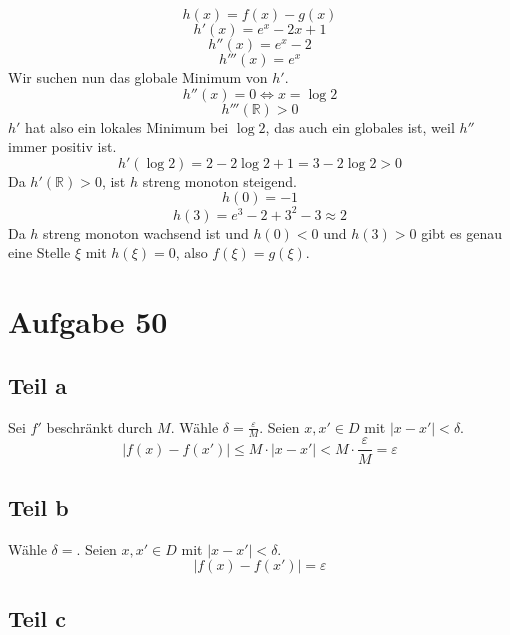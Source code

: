 \documentclass[a4paper,10pt]{article}
\begin{document}
\begin{equation}
 h(x) = f(x) - g(x)
\end{equation}
\begin{equation}
 h'(x) = e^x - 2x + 1
\end{equation}
\begin{equation}
 h''(x) = e^x - 2
\end{equation}
\begin{equation}
 h'''(x) = e^x
\end{equation}
Wir suchen nun das globale Minimum von $h'$.
\begin{equation}
 h''(x) = 0 \Leftrightarrow x = \log 2
\end{equation}
\begin{equation}
 h'''(\mathbb{R}) > 0
\end{equation}
$h'$ hat also ein lokales Minimum bei $\log 2$, das auch ein globales ist, weil $h''$ immer positiv ist.
\begin{equation}
 h'(\log 2) = 2 - 2\log 2 + 1 = 3 - 2 \log 2 > 0
\end{equation}
Da $h'(\mathbb{R}) > 0$, ist $h$ streng monoton steigend.
\begin{equation}
 h(0) = -1
\end{equation}
\begin{equation}
 h(3) = e^3 - 2 + 3^2 - 3 \approx 2
\end{equation}
Da $h$ streng monoton wachsend ist und $h(0) < 0$ und $h(3) > 0$ gibt es genau eine Stelle $\xi$ mit $h(\xi) = 0$, also $f(\xi) = g(\xi)$.

\section*{Aufgabe 50}

\subsection*{Teil a}

Sei $f'$ beschränkt durch $M$.
Wähle $\delta = \frac{\varepsilon}{M}$.
Seien $x, x' \in D$ mit $|x - x'| < \delta$.
\begin{equation}
 |f(x) - f(x')| \le M \cdot |x - x'| < M \cdot \frac{\varepsilon}{M} = \varepsilon
\end{equation}

\subsection*{Teil b}

Wähle $\delta = $.
Seien $x, x' \in D$ mit $|x - x'| < \delta$.
\begin{equation}
 |f(x) - f(x')|  = \varepsilon
\end{equation}

\subsection*{Teil c}
\end{document}
